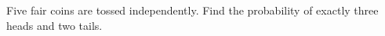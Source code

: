 Five fair coins are tossed independently. Find the probability of exactly three heads and two tails.
